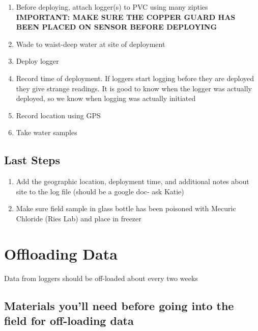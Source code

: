 \documentclass[
  letterpaper,
  DIV=11,
  numbers=noendperiod]{scrreprt}
\begin{document}
\begin{enumerate}
\def\labelenumi{\arabic{enumi}.}
\item
  Before deploying, attach logger(s) to PVC using many zipties
  \textbf{IMPORTANT: MAKE SURE THE COPPER GUARD HAS BEEN PLACED ON
  SENSOR BEFORE DEPLOYING}
\item
  Wade to waist-deep water at site of deployment
\item
  Deploy logger
\item
  Record time of deployment. If loggers start logging before they are
  deployed they give strange readings. It is good to know when the
  logger was actually deployed, so we know when logging was actually
  initiated
\item
  Record location using GPS
\item
  Take water samples
\end{enumerate}

\hypertarget{last-steps-1}{%
\subsection*{\texorpdfstring{\textbf{Last
Steps}}{Last Steps}}\label{last-steps-1}}

\begin{enumerate}
\def\labelenumi{\arabic{enumi}.}
\item
  Add the geographic location, deployment time, and additional notes
  about site to the log file (should be a google doc- ask Katie)
\item
  Make sure field sample in glass bottle has been poisoned with Mecuric
  Chloride (Ries Lab) and place in freezer
\end{enumerate}

\hypertarget{offloading-data-1}{%
\section*{\texorpdfstring{\textbf{Offloading
Data}}{Offloading Data}}\label{offloading-data-1}}


Data from loggers should be off-loaded about every two weeks

\hypertarget{materials-youll-need-before-going-into-the-field-for-off-loading-data-1}{%
\subsection*{\texorpdfstring{\textbf{Materials you'll need before going
into the field for off-loading
data}}{Materials you'll need before going into the field for off-loading data}}\label{materials-youll-need-before-going-into-the-field-for-off-loading-data-1}}
\end{document}
